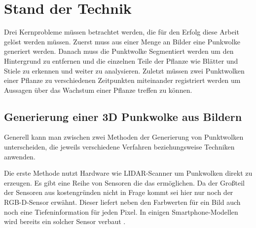 \documentclass[12pt,titlepage, twoside]{article}
\begin{document}
\newpage
\section{Stand der Technik}
\label{sec:stand}
%

Drei Kernprobleme müssen betrachtet werden, die für den Erfolg diese Arbeit gelöst werden müssen. 
Zuerst muss aus einer Menge an Bilder eine Punkwolke generiert werden. Danach muss die Punktwolke Segmentiert werden um den Hintergrund zu entfernen und die einzelnen Teile der Pflanze wie Blätter und Stiele zu erkennen und weiter zu analysieren. 
Zuletzt müssen zwei Punktwolken einer Pflanze zu verschiedenen Zeitpunkten miteinander registriert werden um Aussagen über das Wachstum einer Pflanze treffen zu können.

\subsection{Generierung einer 3D Punkwolke aus Bildern}
\label{sec:stand:pointcloud}

Generell kann man zwischen zwei Methoden der Generierung von Punktwolken unterscheiden, die jeweils verschiedene Verfahren beziehungsweise Techniken anwenden.

Die erste Methode nutzt Hardware wie LIDAR-Scanner \cite{lidar} um Punkwolken direkt zu erzeugen. Es gibt eine Reihe von Sensoren die das ermöglichen. Da der Großteil der Sensoren aus kostengründen nicht in Frage kommt sei hier nur noch der RGB-D-Sensor erwähnt. 
Dieser liefert neben den Farbwerten für ein Bild auch noch eine Tiefeninformation für jeden Pixel. In einigen Smartphone-Modellen wird bereits ein solcher Sensor verbaut \cite{rgbd_smartphones}.
\end{document}
